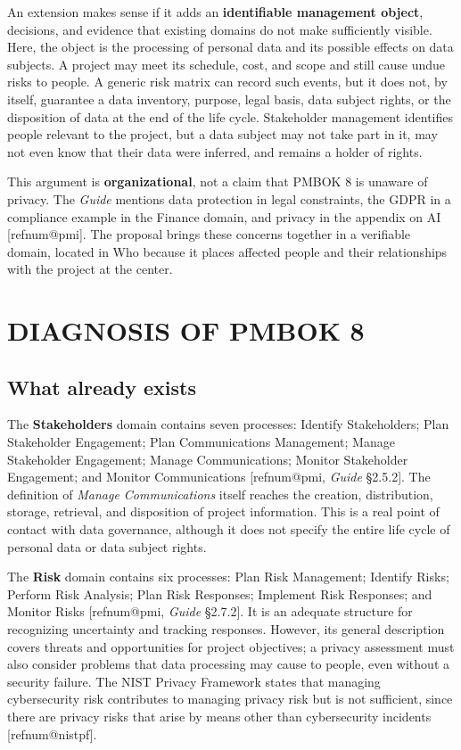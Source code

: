 \documentclass[12pt,a4paper,article,oneside,brazil,english]{abntex2}
\makeatletter
\newcommand{\refnum}[1]{\csname refnum@#1\endcsname}
\makeatother
\begin{document}
An extension makes sense if it adds an \textbf{identifiable management object}, decisions, and evidence that existing domains do not make sufficiently visible. Here, the object is the processing of personal data and its possible effects on data subjects. A project may meet its schedule, cost, and scope and still cause undue risks to people. A generic risk matrix can record such events, but it does not, by itself, guarantee a data inventory, purpose, legal basis, data subject rights, or the disposition of data at the end of the life cycle. Stakeholder management identifies people relevant to the project, but a data subject may not take part in it, may not even know that their data were inferred, and remains a holder of rights.

This argument is \textbf{organizational}, not a claim that PMBOK 8 is unaware of privacy. The \textit{Guide} mentions data protection in legal constraints, the GDPR in a compliance example in the Finance domain, and privacy in the appendix on AI [\refnum{pmi}]. The proposal brings these concerns together in a verifiable domain, located in Who because it places affected people and their relationships with the project at the center.

\section{DIAGNOSIS OF PMBOK 8}
\subsection{What already exists}

The \textbf{Stakeholders} domain contains seven processes: Identify Stakeholders; Plan Stakeholder Engagement; Plan Communications Management; Manage Stakeholder Engagement; Manage Communications; Monitor Stakeholder Engagement; and Monitor Communications [\refnum{pmi}, \textit{Guide} §2.5.2]. The definition of \textit{Manage Communications} itself reaches the creation, distribution, storage, retrieval, and disposition of project information. This is a real point of contact with data governance, although it does not specify the entire life cycle of personal data or data subject rights.

The \textbf{Risk} domain contains six processes: Plan Risk Management; Identify Risks; Perform Risk Analysis; Plan Risk Responses; Implement Risk Responses; and Monitor Risks [\refnum{pmi}, \textit{Guide} §2.7.2]. It is an adequate structure for recognizing uncertainty and tracking responses. However, its general description covers threats and opportunities for project objectives; a privacy assessment must also consider problems that data processing may cause to people, even without a security failure. The NIST Privacy Framework states that managing cybersecurity risk contributes to managing privacy risk but is not sufficient, since there are privacy risks that arise by means other than cybersecurity incidents [\refnum{nistpf}].
\end{document}
